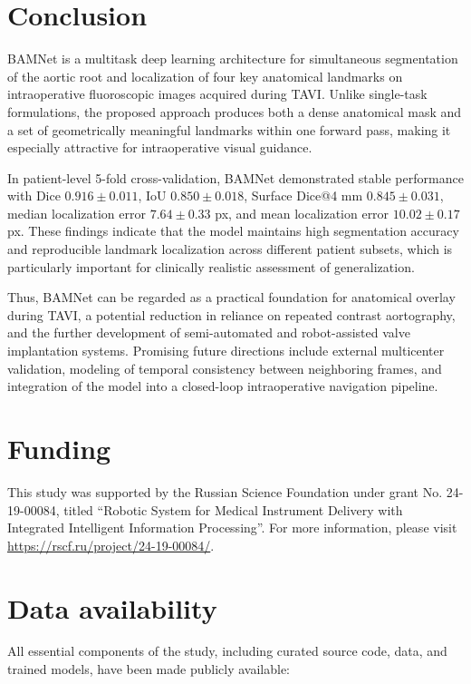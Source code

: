 \documentclass[preprint,12pt,authoryear]{elsarticle}
\begin{document}
\section{Conclusion}

BAMNet is a multitask deep learning architecture for simultaneous segmentation of the aortic root and localization of four key anatomical landmarks on intraoperative fluoroscopic images acquired during TAVI. Unlike single-task formulations, the proposed approach produces both a dense anatomical mask and a set of geometrically meaningful landmarks within one forward pass, making it especially attractive for intraoperative visual guidance.

In patient-level 5-fold cross-validation, BAMNet demonstrated stable performance with Dice $0.916 \pm 0.011$, IoU $0.850 \pm 0.018$, Surface Dice@4 mm $0.845 \pm 0.031$, median localization error $7.64 \pm 0.33$ px, and mean localization error $10.02 \pm 0.17$ px. These findings indicate that the model maintains high segmentation accuracy and reproducible landmark localization across different patient subsets, which is particularly important for clinically realistic assessment of generalization.

Thus, BAMNet can be regarded as a practical foundation for anatomical overlay during TAVI, a potential reduction in reliance on repeated contrast aortography, and the further development of semi-automated and robot-assisted valve implantation systems. Promising future directions include external multicenter validation, modeling of temporal consistency between neighboring frames, and integration of the model into a closed-loop intraoperative navigation pipeline.

\section*{Funding}

This study was supported by the Russian Science Foundation under grant No. 24-19-00084, titled ``Robotic System for Medical Instrument Delivery with Integrated Intelligent Information Processing''. For more information, please visit \url{https://rscf.ru/project/24-19-00084/}.

\section*{Data availability}

All essential components of the study, including curated source code, data, and trained models, have been made publicly available:
\end{document}
